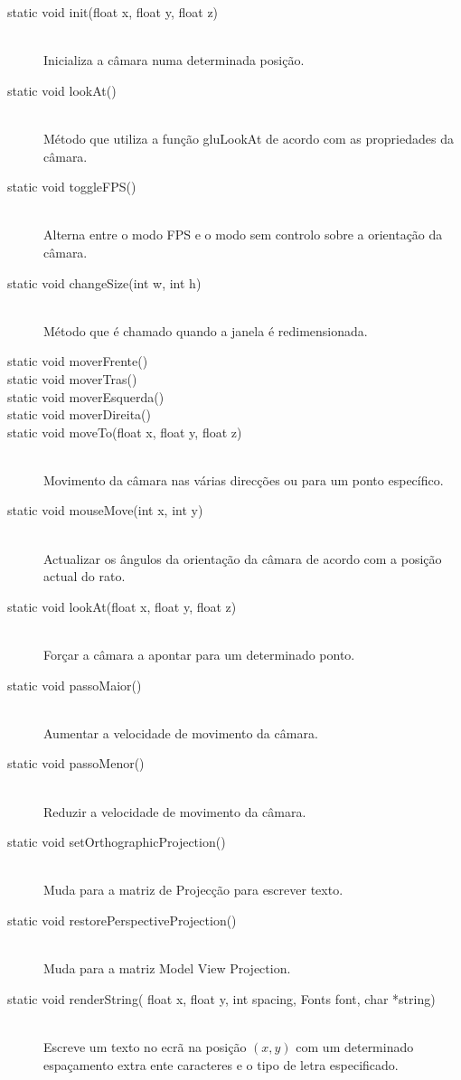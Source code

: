 \documentclass[a5paper,onecolumn, 11pt]{article}
\begin{document}
\begin{description}
	\item[static void init(float x, float y, float z)] \hfill \\
	Inicializa a câmara numa determinada posição.

	\item[static void lookAt()] \hfill \\
	Método que utiliza a função gluLookAt de acordo com as propriedades da câmara.

	\item[static void toggleFPS()] \hfill \\
	Alterna entre o modo FPS e o modo sem controlo sobre a orientação da câmara.

	\item[static void changeSize(int w, int h)] \hfill \\
	Método que é chamado quando a janela é redimensionada.

	\item[static void moverFrente()]
	\item[static void moverTras()]
	\item[static void moverEsquerda()]
	\item[static void moverDireita()]
	\item[static void moveTo(float x, float y, float z)] \hfill \\
	Movimento da câmara nas várias direcções ou para um ponto específico.

	\item[static void mouseMove(int x, int y)] \hfill \\
	Actualizar os ângulos da orientação da câmara de acordo com a posição actual do rato.

	\item[static void lookAt(float x, float y, float z)] \hfill \\
	Forçar a câmara a apontar para um determinado ponto.

	\item[static void passoMaior()] \hfill \\
	Aumentar a velocidade de movimento da câmara.

	\item[static void passoMenor()] \hfill \\
	Reduzir a velocidade de movimento da câmara.

	\item[static void setOrthographicProjection()] \hfill \\
	Muda para a matriz de Projecção para escrever texto.

	\item[static void restorePerspectiveProjection()] \hfill \\
	Muda para a matriz Model View Projection.

	\item[static void renderString( float x, float y, int spacing, Fonts font, char *string)] \hfill \\
	Escreve um texto no ecrã na posição $(x,y)$ com um determinado espaçamento extra ente caracteres e o tipo de letra especificado.
\end{description}
\end{document}
